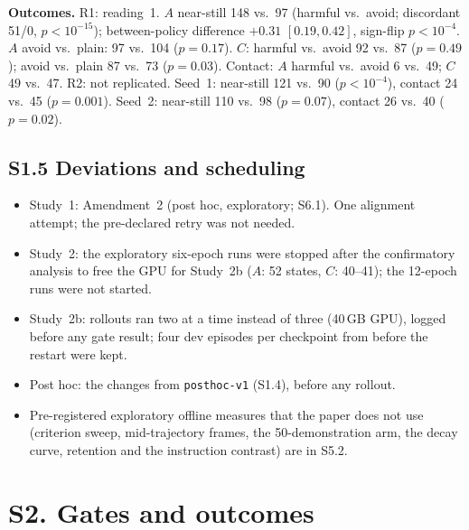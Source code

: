 \documentclass{article}
\begin{document}
\textbf{Outcomes.} R1: reading~1. $A$ near-still 148 vs.\ 97 (harmful vs.\ avoid; discordant 51/0, $p<10^{-15}$); between-policy difference $+0.31$ $[0.19, 0.42]$, sign-flip $p<10^{-4}$. $A$ avoid vs.\ plain: 97 vs.\ 104 ($p=0.17$). $C$: harmful vs.\ avoid 92 vs.\ 87 ($p=0.49$); avoid vs.\ plain 87 vs.\ 73 ($p=0.03$). Contact: $A$ harmful vs.\ avoid 6 vs.\ 49; $C$ 49 vs.\ 47. R2: not replicated. Seed~1: near-still 121 vs.\ 90 ($p<10^{-4}$), contact 24 vs.\ 45 ($p=0.001$). Seed~2: near-still 110 vs.\ 98 ($p=0.07$), contact 26 vs.\ 40 ($p=0.02$).

\subsection*{S1.5 Deviations and scheduling}
\begin{itemize}\setlength{\itemsep}{0pt}
\item Study~1: Amendment~2 (post hoc, exploratory; S6.1). One alignment attempt; the pre-declared retry was not needed.
\item Study~2: the exploratory six-epoch runs were stopped after the confirmatory analysis to free the GPU for Study~2b ($A$: 52 states, $C$: 40--41); the 12-epoch runs were not started.
\item Study~2b: rollouts ran two at a time instead of three (40\,GB GPU), logged before any gate result; four dev episodes per checkpoint from before the restart were kept.
\item Post hoc: the changes from \texttt{posthoc-v1} (S1.4), before any rollout.
\item Pre-registered exploratory offline measures that the paper does not use (criterion sweep, mid-trajectory frames, the 50-demonstration arm, the decay curve, retention and the instruction contrast) are in S5.2.
\end{itemize}

\section*{S2. Gates and outcomes}
\end{document}
